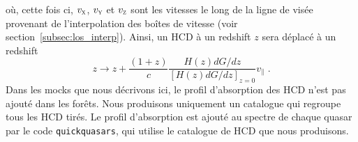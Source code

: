 où, cette fois ci, $v_{\textsc{x}}$, $v_{\textsc{y}}$ et $v_{\textsc{z}}$ sont les vitesses le long de la ligne de visée provenant de l'interpolation des boîtes de vitesse (voir section~\ref{subsec:los_interp}).
Ainsi, un HCD à un redshift $z$ sera déplacé à un redshift
\begin{equation}
  z \rightarrow  z + \frac{(1+z)}{c} \frac{H(z) dG/dz}{[H(z) dG/dz]_{z=0}} v_{\parallel} \; .
\end{equation}
Dans les mocks que nous décrivons ici, le profil d'absorption des HCD n'est pas ajouté dans les forêts. Nous produisons uniquement un catalogue qui regroupe tous les HCD tirés. Le profil d'absorption est ajouté au spectre de chaque quasar par le code \texttt{quickquasars}, qui utilise le catalogue de HCD que nous produisons.


